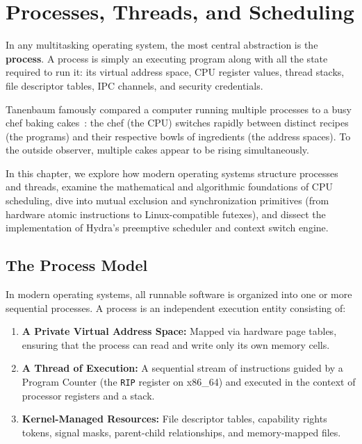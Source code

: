 \chapter{Processes, Threads, and Scheduling}
\label{chap:processes}

In any multitasking operating system, the most central abstraction is the \textbf{process}. A process is simply an executing program along with all the state required to run it: its virtual address space, CPU register values, thread stacks, file descriptor tables, IPC channels, and security credentials.

Tanenbaum famously compared a computer running multiple processes to a busy chef baking cakes~\cite{tanenbaum2006operating}: the chef (the CPU) switches rapidly between distinct recipes (the programs) and their respective bowls of ingredients (the address spaces). To the outside observer, multiple cakes appear to be rising simultaneously.

In this chapter, we explore how modern operating systems structure processes and threads, examine the mathematical and algorithmic foundations of CPU scheduling, dive into mutual exclusion and synchronization primitives (from hardware atomic instructions to Linux-compatible futexes), and dissect the implementation of Hydra's preemptive scheduler and context switch engine.

\section{The Process Model}
\label{sec:process_model}

In modern operating systems, all runnable software is organized into one or more sequential processes. A process is an independent execution entity consisting of:
\begin{enumerate}
    \item \textbf{A Private Virtual Address Space:} Mapped via hardware page tables, ensuring that the process can read and write only its own memory cells.
    \item \textbf{A Thread of Execution:} A sequential stream of instructions guided by a Program Counter (the \texttt{RIP} register on x86\_64) and executed in the context of processor registers and a stack.
    \item \textbf{Kernel-Managed Resources:} File descriptor tables, capability rights tokens, signal masks, parent-child relationships, and memory-mapped files.
\end{enumerate}

